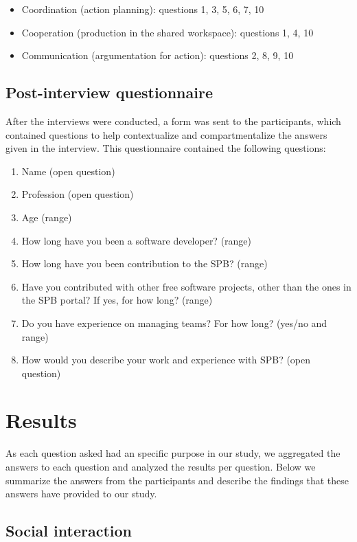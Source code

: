 \documentclass{sigchi}
\begin{document}
\begin{itemize}
\item Coordination (action planning): questions 1, 3, 5, 6, 7, 10
\item Cooperation (production in the shared workspace): questions 1, 4, 10
\item Communication (argumentation for action): questions 2, 8, 9, 10
\end{itemize}

\subsection{Post-interview questionnaire}

After the interviews were conducted, a form was sent to the participants, which contained questions to help contextualize and compartmentalize the answers given in the interview. This questionnaire contained the following questions:

\begin{enumerate}
  \item Name (open question)
  \item Profession (open question)
  \item Age (range)
  \item How long have you been a software developer? (range)
  \item How long have you been contribution to the SPB? (range)
  \item Have you contributed with other free software projects, other than the ones in the SPB portal? If yes, for how long? (range)
  \item Do you have experience on managing teams? For how long? (yes/no and range)
  \item How would you describe your work and experience with SPB? (open question) 
\end{enumerate}


%
%
%
%
\section{Results}

As each question asked had an specific purpose in our study, we aggregated the answers to each question and analyzed the results per question. Below we summarize the answers from the participants and describe the findings that these answers have provided to our study.

\subsection{Social interaction}
\end{document}

